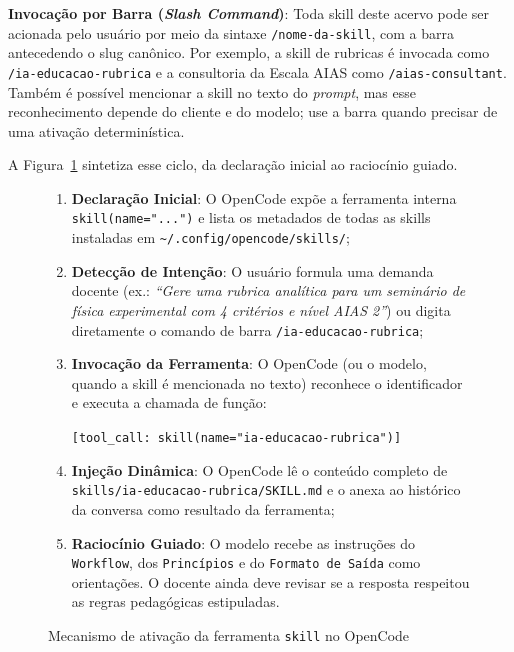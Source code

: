 \begin{conceitochave}
\textbf{Invoca{\c c}{\~a}o por Barra (\emph{Slash Command})}: Toda skill deste acervo pode ser acionada pelo usu{\'a}rio por meio da sintaxe \texttt{/nome-da-skill}, com a barra antecedendo o slug can{\^o}nico. Por exemplo, a skill de rubricas {\'e} invocada como \texttt{/ia-educacao-rubrica} e a consultoria da Escala AIAS como \texttt{/aias-consultant}. Tamb{\'e}m {\'e} poss{\'i}vel mencionar a skill no texto do \emph{prompt}, mas esse reconhecimento depende do cliente e do modelo; use a barra quando precisar de uma ativa{\c c}{\~a}o determin{\'i}stica.
\end{conceitochave}

A Figura~\ref{fig:fluxo-skill} sintetiza esse ciclo, da declara{\c c}{\~a}o inicial ao racioc{\'i}nio guiado.

\begin{figure}[htbp]
  \centering
  \begin{tcolorbox}[colback=boxbg, colframe=primary, arc=2mm, title={\bfseries Ciclo de Vida e Ativa{\c c}{\~a}o de uma Skill no OpenCode}]
    \small
    \begin{enumerate}
      \item \textbf{Declara{\c c}{\~a}o Inicial}: O OpenCode exp{\~o}e a ferramenta interna \texttt{skill(name="...")} e lista os metadados de todas as skills instaladas em \texttt{\textasciitilde/.config/opencode/skills/};
      \item \textbf{Detec{\c c}{\~a}o de Inten{\c c}{\~a}o}: O usu{\'a}rio formula uma demanda docente (ex.: \emph{``Gere uma rubrica anal{\'i}tica para um semin{\'a}rio de f{\'i}sica experimental com 4 crit{\'e}rios e n{\'i}vel AIAS 2''}) ou digita diretamente o comando de barra \texttt{/ia-educacao-rubrica};
      \item \textbf{Invoca{\c c}{\~a}o da Ferramenta}: O OpenCode (ou o modelo, quando a skill {\'e} mencionada no texto) reconhece o identificador e executa a chamada de fun{\c c}{\~a}o:
      \begin{center}
        \texttt{[tool\_call: skill(name="ia-educacao-rubrica")]}
      \end{center}
      \item \textbf{Inje{\c c}{\~a}o Din{\^a}mica}: O OpenCode l{\^e} o conte{\'u}do completo de \texttt{skills/ia-educacao-rubrica/SKILL.md} e o anexa ao hist{\'o}rico da conversa como resultado da ferramenta;
      \item \textbf{Racioc{\'i}nio Guiado}: O modelo recebe as instru{\c c}{\~o}es do \texttt{Workflow}, dos \texttt{Princ{\'i}pios} e do \texttt{Formato de Sa{\'i}da} como orienta{\c c}{\~o}es. O docente ainda deve revisar se a resposta respeitou as regras pedag{\'o}gicas estipuladas.
    \end{enumerate}
  \end{tcolorbox}
  \caption{Mecanismo de ativa{\c c}{\~a}o da ferramenta \texttt{skill} no OpenCode}
  \label{fig:fluxo-skill}
\end{figure}

